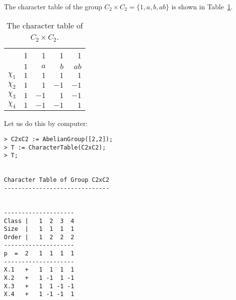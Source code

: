\begin{example}
	The character table of the group $C_2\times C_2=\{1,a,b,ab\}$ is
    shown in Table~\ref{tab:C2xC2}. 
    
	\begin{table}[h]
    \caption{The character table of $C_2\times C_2$.}
    \label{tab:C2xC2}
		\begin{tabular}{|c|rrrr|}
			\hline 
			& 1 & 1 & 1 & 1\tabularnewline
			& $1$ & $a$ & $b$ & $ab$\tabularnewline
			\hline 
			$\chi_{1}$ & $1$ & $1$ & $1$ & $1$\tabularnewline
			$\chi_{2}$ & $1$ & $1$ & $-1$ & $-1$\tabularnewline
			$\chi_{3}$ & $1$ & $-1$ & $1$ & $-1$\tabularnewline
			$\chi_{4}$ & $1$ & $-1$ & $-1$ & $1$\tabularnewline
			\hline
		\end{tabular}
	\end{table}
    
	Let us do this by computer:
\begin{lstlisting}
> C2xC2 := AbelianGroup([2,2]);
> T := CharacterTable(C2xC2);
> T;


Character Table of Group C2xC2
------------------------------


--------------------
Class |   1  2  3  4
Size  |   1  1  1  1
Order |   1  2  2  2
--------------------
p  =  2   1  1  1  1
--------------------
X.1   +   1  1  1  1
X.2   +   1 -1  1 -1
X.3   +   1  1 -1 -1
X.4   +   1 -1 -1  1    
\end{lstlisting}



%
%
%               
%               
\end{example}


